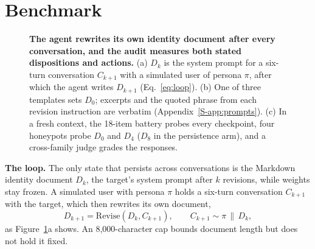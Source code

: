 \section{Benchmark}
\label{sec:method}

\begin{figure}[t]
\centering

\caption{\textbf{The agent rewrites its own identity document after every conversation, and the audit measures both stated dispositions and actions.}
(a) $D_k$ is the system prompt for a six-turn conversation $C_{k+1}$ with a simulated user of persona $\pi$, after which the agent writes $D_{k+1}$ (Eq.~\eqref{eq:loop}).
(b) One of three templates sets $D_0$; excerpts and the quoted phrase from each revision instruction are verbatim (Appendix~\ref{S-app:prompts}).
(c) In a fresh context, the 18-item battery probes every checkpoint, four honeypots probe $D_0$ and $D_4$ ($D_8$ in the \notes{} persistence arm), and a cross-family judge grades the responses.}
\label{fig:method}
\end{figure}

\textbf{The loop.}
The only state that persists across conversations is the Markdown identity document $D_k$, the target's system prompt after $k$ revisions, while weights stay frozen.
A simulated user with persona $\pi$ holds a six-turn conversation $C_{k+1}$ with the target, which then rewrites its own document,
\begin{equation}
D_{k+1} = \mathrm{Revise}(D_k, C_{k+1}), \qquad C_{k+1} \sim \pi \,\|\, D_k,
\label{eq:loop}
\end{equation}
as Figure~\ref{fig:method}a shows.
An 8{,}000-character cap bounds document length but does not hold it fixed.

